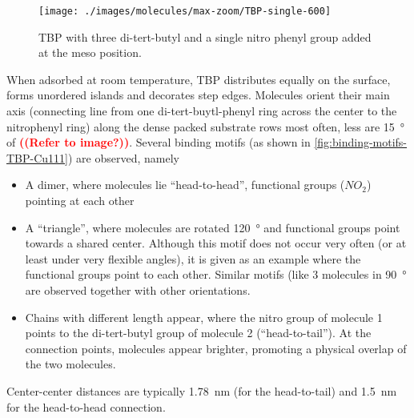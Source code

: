 \label{sec:single-TBP-Cu111}
\begin{wrapfigure}{r}{5cm}\centering
	\texttt{[image: ./images/molecules/max-zoom/TBP-single-600]}
	\caption{TBP with three di-tert-butyl and a single nitro phenyl group added at the meso position.}
	\label{fig:}
\end{wrapfigure}
When adsorbed at room temperature, TBP distributes equally on the surface, forms unordered islands and decorates step edges. Molecules orient their main axis (connecting line from one di-tert-buytl-phenyl ring across the center to the nitrophenyl ring) along the dense packed substrate rows most often, less are \SI{15}{\degree} of \textcolor{red}{\textbf{((Refer to image?))}}. Several binding motifs (as shown in \autoref{fig:binding-motifs-TBP-Cu111}) are observed, namely
\begin{itemize}
 \item A dimer, where molecules lie ``head-to-head'', functional groups ($NO_2$) pointing at each other
 \item A ``triangle'', where molecules are rotated \SI{120}{\degree} and functional groups point towards a shared center. Although this motif does not occur very often (or at least under very flexible angles), it is given as an example where the functional groups point to each other. Similar motifs (like 3 molecules in \SI{90}{\degree} are observed together with other orientations. 
 \item Chains with different length appear, where the nitro group of molecule 1 points to the di-tert-butyl group of molecule 2 (``head-to-tail''). At the connection points, molecules appear brighter, promoting a physical overlap of the two molecules.
\end{itemize}

Center-center distances are typically \SI{1.78}{\nano \meter} (for the head-to-tail) and \SI{1.5}{\nano \meter} for the head-to-head connection. 

